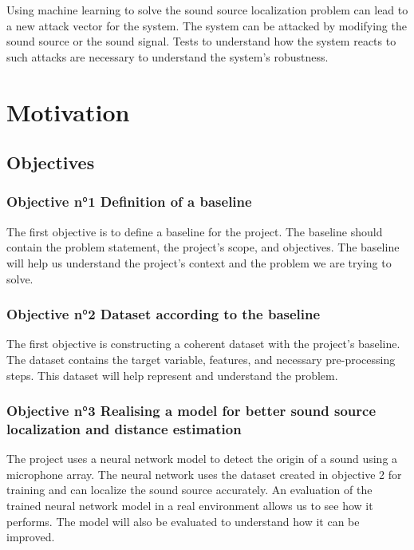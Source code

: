 Using machine learning to solve the sound source localization problem can lead to a new attack vector for the system. The system can be attacked by modifying the sound source or the sound signal. Tests to understand how the system reacts to such attacks are necessary to understand the system's robustness.

\section{Motivation}
\label{intro:motivation}

\subsection{Objectives}

\subsubsection{Objective n°1 Definition of a baseline}

The first objective is to define a baseline for the project. The baseline should contain the problem statement, the project's scope, and objectives. The baseline will help us understand the project's context and the problem we are trying to solve.

\subsubsection{Objective n°2 Dataset according to the baseline}

The first objective is constructing a coherent dataset with the project's baseline. The dataset contains the target variable, features, and necessary pre-processing steps. This dataset will help represent and understand the problem.

\subsubsection{Objective n°3 Realising a model for better sound source localization and distance estimation}

The project uses a neural network model to detect the origin of a sound using a microphone array. The neural network uses the dataset created in objective 2 for training and can localize the sound source accurately. An evaluation of the trained neural network model in a real environment allows us to see how it performs. The model will also be evaluated to understand how it can be improved.

